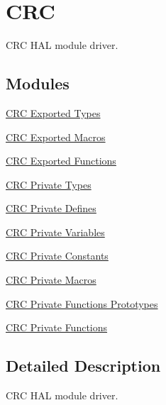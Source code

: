 \hypertarget{group___c_r_c}{}\section{C\+RC}
\label{group___c_r_c}


C\+RC H\+AL module driver.  


\subsection*{Modules}
\begin{DoxyCompactItemize}
\item 
\hyperlink{group___c_r_c___exported___types}{C\+R\+C Exported Types}
\item 
\hyperlink{group___c_r_c___exported___macros}{C\+R\+C Exported Macros}
\item 
\hyperlink{group___c_r_c___exported___functions}{C\+R\+C Exported Functions}
\item 
\hyperlink{group___c_r_c___private___types}{C\+R\+C Private Types}
\item 
\hyperlink{group___c_r_c___private___defines}{C\+R\+C Private Defines}
\item 
\hyperlink{group___c_r_c___private___variables}{C\+R\+C Private Variables}
\item 
\hyperlink{group___c_r_c___private___constants}{C\+R\+C Private Constants}
\item 
\hyperlink{group___c_r_c___private___macros}{C\+R\+C Private Macros}
\item 
\hyperlink{group___c_r_c___private___functions___prototypes}{C\+R\+C Private Functions Prototypes}
\item 
\hyperlink{group___c_r_c___private___functions}{C\+R\+C Private Functions}
\end{DoxyCompactItemize}


\subsection{Detailed Description}
C\+RC H\+AL module driver. 

